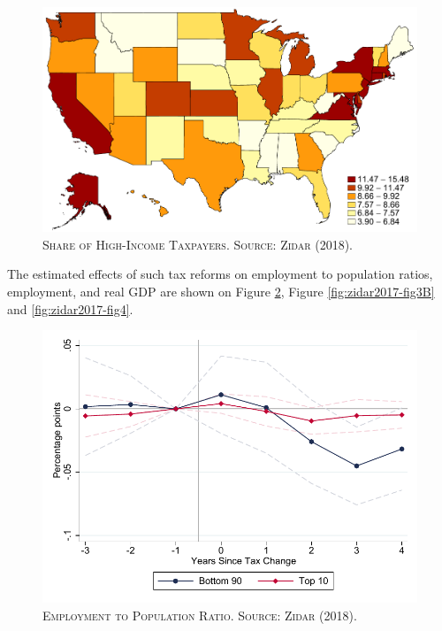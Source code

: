 \documentclass[]{book}
\begin{document}
\begin{figure}

{\centering \includegraphics[width=0.8\linewidth,height=0.8\textheight]{figures/Zidar2017/fig2B} 

}

\caption{\textsc{Share of High-Income Taxpayers. Source:
Zidar (2018).}}\label{fig:zidar2017-fig2B}
\end{figure}

The estimated effects of such tax reforms on employment to population
ratios, employment, and real GDP are shown on Figure
\ref{fig:zidar2017-fig3A}, Figure \ref{fig:zidar2017-fig3B} and
\ref{fig:zidar2017-fig4}.




\begin{figure}

{\centering \includegraphics[width=0.8\linewidth,height=0.8\textheight]{figures/Zidar2017/fig3A} 

}

\caption{\textsc{Employment to Population Ratio. Source:
Zidar (2018).}}\label{fig:zidar2017-fig3A}
\end{figure}
\end{document}
